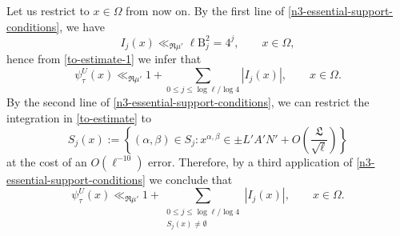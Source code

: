 \documentclass[11pt,oneside]{amsart}
\numberwithin{equation}{section}
\theoremstyle{remark}
\theoremstyle{plain}
\newcommand\BB{\mathrm{B}}
\renewcommand\leq{\leqslant}
\begin{document}
Let us restrict to $x\in\Omega$ from now on. By the first line of \eqref{n3-essential-support-conditions}, we have
\begin{equation}\label{eq:trivialforIj}
I_j(x)\ll_{\Re\mu'}\ell\BB_j^2=4^j,\qquad x\in\Omega,
\end{equation}
hence from \eqref{to-estimate-1} we infer that
\[
\psi_{\tau}^U(x)\ll_{\Re\mu'}1+\sum_{0\leq j\leq \log\ell/\log 4}|I_j(x)|,\qquad x\in\Omega.
\]
By the second line of \eqref{n3-essential-support-conditions}, we can restrict the integration in \eqref{to-estimate} to
\[
S_j(x) := \left\{ (\alpha,\beta)\in S_j:x^{\alpha,\beta}\in \pm L'A'N'+O\left(\frac{\mathfrak{L}}{\sqrt{\ell}}\right)\right\}
\]
at the cost of an $O(\ell^{-10})$ error. Therefore, by a third application of \eqref{n3-essential-support-conditions} we conclude that
\begin{equation}
\label{to-estimate-2}
\psi_{\tau}^U(x)\ll_{\Re\mu'} 1+\sum_{\substack{0\leq j\leq \log\ell/\log 4\\S_j(x)\neq\emptyset}}|I_j(x)|,\qquad x\in\Omega.
\end{equation}
\end{document}
